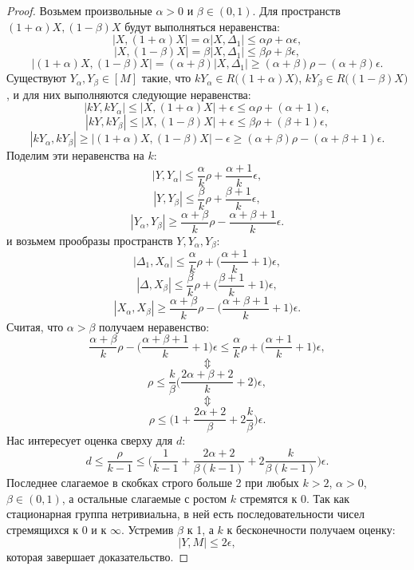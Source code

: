 \documentclass[11pt,twoside,draft
]{article}
\begin{document}
\begin{proof}
  Возьмем произвольные $\alpha > 0$ и $\beta \in (0,1)$. Для
  пространств $(1+\alpha)X, (1-\beta)X$ будут выполняться неравенства:
  $$|X, (1+\alpha)X| = \alpha |X, \Delta_1| \le \alpha\rho + \alpha\epsilon,$$
  $$|X, (1-\beta)X| = \beta|X, \Delta_1| \le \beta\rho + \beta\epsilon,$$
  $$|(1+\alpha) X, (1-\beta)X| = (\alpha + \beta)|X, \Delta_1| \ge
  (\alpha+\beta)\rho - (\alpha+\beta)\epsilon.$$
  Существуют
  $Y_\alpha, Y_\beta \in [M]$ такие, что
  $kY_\alpha \in R\big((1+\alpha)X\big)$, $kY_\beta \in
  R\big((1-\beta)X\big)$, и
  для них выполняются следующие неравенства:
  $$|kY, kY_\alpha| \le |X, (1+\alpha)X| + \epsilon \le \alpha\rho +
  (\alpha+1)\epsilon,$$
  $$|kY, kY_\beta| \le |X, (1-\beta)X| + \epsilon \le \beta\rho +
  (\beta+1)\epsilon,$$
  $$|kY_\alpha, kY_\beta| \ge |(1+\alpha)X, (1-\beta)X| - \epsilon
  \ge  (\alpha+\beta)\rho - (\alpha+\beta+1)\epsilon.$$
  Поделим эти неравенства на $k$:
  $$|Y, Y_{\alpha}| \le \frac{\alpha}{k}\rho + \frac{\alpha+1}{k}\epsilon,$$
  $$|Y, Y_{\beta}| \le \frac{\beta}{k}\rho + \frac{\beta+1}{k}\epsilon,$$
  $$|Y_\alpha, Y_{\beta}| \ge \frac{\alpha+\beta}{k}\rho -
  \frac{\alpha+\beta+1}{k}\epsilon.$$
  и возьмем прообразы пространств $Y, Y_{\alpha}, Y_{\beta}$:
  $$|\Delta_1, X_{\alpha}| \le \frac{\alpha}{k}\rho +
  \big(\frac{\alpha+1}{k} + 1\big)\epsilon,$$
  $$|\Delta, X_{\beta}| \le \frac{\beta}{k}\rho +
  \big(\frac{\beta+1}{k}+1\big)\epsilon,$$
  $$|X_\alpha, X_{\beta}| \ge \frac{\alpha+\beta}{k}\rho -
  \big(\frac{\alpha+\beta+1}{k}+1\big)\epsilon.$$
  Считая, что $\alpha > \beta$ получаем неравенство:
  $$\frac{\alpha+\beta}{k}\rho -
  \big(\frac{\alpha+\beta+1}{k}+1\big)\epsilon \le
  \frac{\alpha}{k}\rho + \big(\frac{\alpha+1}{k} + 1\big)\epsilon,$$
  $$\Updownarrow$$
  $$\rho \le \frac{k}{\beta}\bigg(\frac{2\alpha+\beta+2}{k}+2\bigg)\epsilon,$$
  $$\Updownarrow$$
  $$\rho \le \bigg(1+\frac{2\alpha + 2}{\beta} +
  2\frac{k}{\beta}\bigg)\epsilon.$$
  Нас интересует оценка сверху для $d$:
  $$d \le \frac{\rho}{k-1} \le \bigg(\frac{1}{k-1}+\frac{2\alpha +
  2}{\beta(k-1)} + 2\frac{k}{\beta(k-1)}\bigg)\epsilon. $$
  Последнее слагаемое в скобках строго больше 2 при любых $k>2$, $\alpha>0$,
  $\beta\in (0,1)$, а остальные слагаемые с ростом $k$ стремятся к
  $0$. Так как стационарная группа нетривиальна, в ней есть
  последовательности чисел стремящихся к 0 и к $\infty$.
  Устремив $\beta$ к 1, а $k$ к бесконечности получаем оценку:
  $$|Y, M| \le 2\epsilon,$$
  которая завершает доказательство.

\end{proof}
\end{document}
